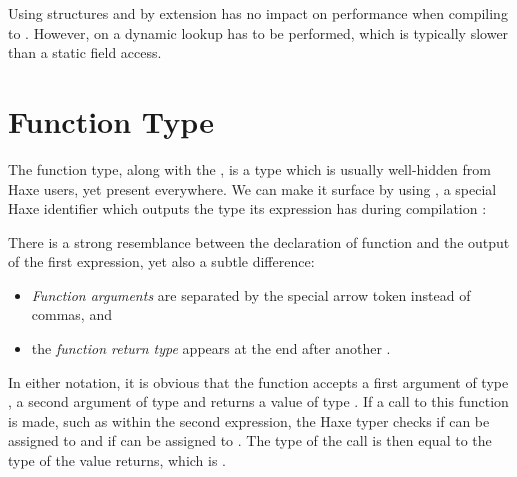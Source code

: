 \documentclass{haxe}
\begin{document}
Using structures and by extension  has no impact on performance when compiling to . However, on  a dynamic lookup has to be performed, which is typically slower than a static field access.



\section{Function Type}
\label{types-function}


The function type, along with the , is a type which is usually well-hidden from Haxe users, yet present everywhere. We can make it surface by using , a special Haxe identifier which outputs the type its expression has during compilation :


There is a strong resemblance between the declaration of function  and the output of the first  expression, yet also a subtle difference:

\begin{itemize}
	\item \emph{Function arguments} are separated by the special arrow token \expr{->} instead of commas, and
	\item the \emph{function return type} appears at the end after another \expr{->}.
\end{itemize}
In either notation, it is obvious that the function  accepts a first argument of type , a second argument of type  and returns a value of type . If a call to this function is made, such as  within the second  expression, the Haxe typer checks if  can be assigned to  and if  can be assigned to . The type of the call is then equal to the type of the value  returns, which is .

\end{document}
